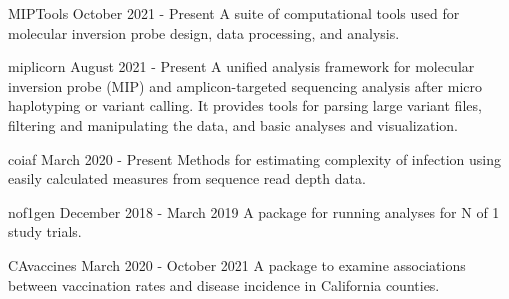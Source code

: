 
\begin{cvprojects}

  \cvproject
    {MIPTools} %
    {October 2021 - Present} %
    {A suite of computational tools used for molecular inversion probe design,
    data processing, and analysis.} %

  \cvproject
    {miplicorn} %
    {August 2021 - Present} %
    {A unified analysis framework for molecular inversion probe (MIP) and
    amplicon-targeted sequencing analysis after micro haplotyping or variant
    calling. It provides tools for parsing large variant files, filtering and
    manipulating the data, and basic analyses and visualization.} %

  \cvproject
    {coiaf} %
    {March 2020 - Present} %
    {Methods for estimating complexity of infection using easily calculated
    measures from sequence read depth data.} %

  \cvproject
    {nof1gen}
    {December 2018 - March 2019}
    {A package for running analyses for N of 1 study trials.}

  \cvproject
    {CAvaccines}
    {March 2020 - October 2021}
    {A package to examine associations between vaccination rates and disease
    incidence in California counties.}

\end{cvprojects}
